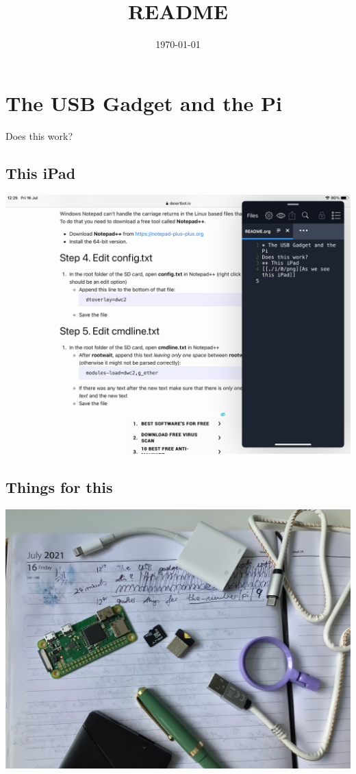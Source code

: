 \documentclass[11pt]{article}
\title{README}
\author{}
\date{\today}
\begin{document}
\maketitle

\setcounter{tocdepth}{3}
\tableofcontents
\vspace*{1cm}
\section{The USB Gadget and the Pi}
\label{sec-1}

Does this work?
\subsection{This iPad}
\label{sec-1-1}

\includegraphics[width=.9\linewidth]{./i/0.png}
\subsection{Things for this}
\label{sec-1-2}

\includegraphics[width=.9\linewidth]{./i/5.jpg}
\end{document}
